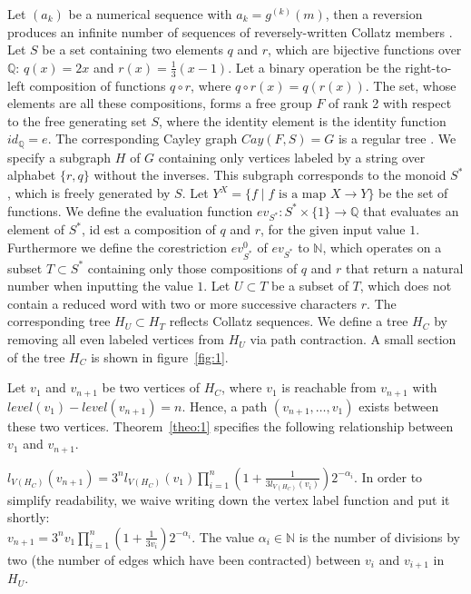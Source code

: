 \documentclass{SciPress_2015}
\begin{document}
Let $(a_k)$ be a numerical sequence with $a_k=g^{(k)}(m)$, then a reversion produces an infinite number of sequences of reversely-written Collatz members \cite{Ref_Klisse}. Let $S$ be a set containing two elements $q$ and $r$, which are bijective functions over $\mathbb{Q}$: $q(x)=2x$ and $r(x)=\frac{1}{3}(x-1)$. Let a binary operation be the right-to-left composition of functions $q\circ r$, where $q\circ r(x)=q(r(x))$. The set, whose elements are all these compositions, forms a free group $F$ of rank 2 with respect to the free generating set $S$, where the identity element is the identity function $id_{\mathbb{Q}}=e$. The corresponding Cayley graph $Cay(F,S)=G$ is a regular tree \cite[p.~66]{Ref_Loeh}. We specify a subgraph $H$ of $G$ containing only vertices labeled by a string over alphabet $\{r,q\}$ without the inverses. This subgraph corresponds to the monoid $S^*$, which is freely generated by $S$. Let $Y^X=\{f\mid f\text{ is a map }X\rightarrow Y\}$ be the set of functions. We define the evaluation function $ev_{S^*}:S^*\times\{1\}\rightarrow\mathbb{Q}$ that evaluates an element of $S^*$, id est a composition of $q$ and $r$, for the given input value $1$. Furthermore we define the corestriction ${ev^0_{S^*}}$ of $ev_{S^*}$ to $\mathbb{N}$, which operates on a subset $T\subset S^*$ containing only those compositions of $q$ and $r$ that return a natural number when inputting the value $1$. Let $U\subset T$ be a subset of $T$, which does not contain a reduced word with two or more successive characters $r$. The corresponding tree $H_{U}\subset H_{T}$ reflects Collatz sequences. We define a tree $H_C$ by removing all even labeled vertices from $H_U$ via path contraction. A small section of the tree $H_C$ is shown in figure~\ref{fig:1}.

Let $v_1$ and $v_{n+1}$ be two vertices of $H_C$, where $v_1$ is reachable from $v_{n+1}$ with $level(v_1)-level(v_{n+1})=n$. Hence, a path $(v_{n+1},\ldots,v_1)$ exists between these two vertices. Theorem~\ref{theo:1} specifies the following relationship between $v_1$ and $v_{n+1}$.

\par\medskip
\begin{theorem}
	\label{theo:1}
	$l_{V(H_C)}(v_{n+1})=3^nl_{V(H_C)}(v_1)\prod_{i=1}^{n}\left(1+\frac{1}{3l_{V(H_C)}(v_{i})}\right)2^{-\alpha_i}$.
	In order to simplify readability, we waive writing down the vertex label function and put it shortly:\\
	$v_{n+1}=3^nv_1\prod_{i=1}^{n}\left(1+\frac{1}{3v_{i}}\right)2^{-\alpha_i}$.
	The value $\alpha_i\in\mathbb{N}$ is the number of divisions by two (the number of edges which have been contracted) between $v_i$ and $v_{i+1}$ in $H_U$.
\end{theorem}
\end{document}
